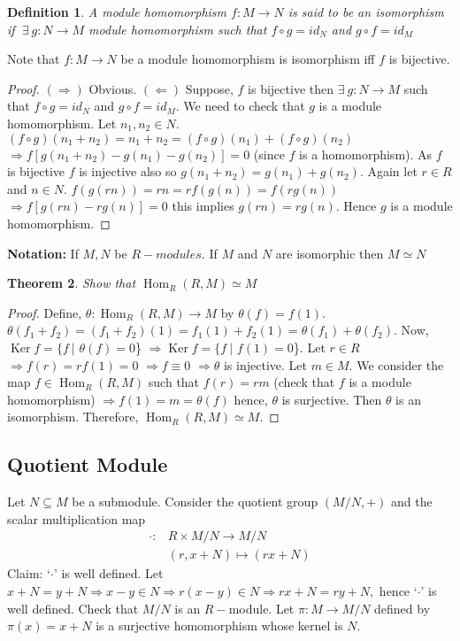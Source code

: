 \documentclass[11pt]{amsart}
\newtheorem{theorem}{Theorem}[section]
\newtheorem{definition}[theorem]{Definition}%
\begin{document}
\begin{definition}
A module homomorphism $f:M\rightarrow N$ is said to be an isomorphism if $~\exists ~g:N\rightarrow M$ module homomorphism such that $f\circ g=id_{N}$ and $g\circ f=id_{M}$  
\end{definition}
Note that $f:M\rightarrow N$ be a module homomorphism is isomorphism iff $f$ is bijective. 
\begin{proof}
$(\Rightarrow)$ Obvious.
\newline $(\Leftarrow)$ Suppose, $f$ is bijective then $\exists~ g:N\rightarrow M$ such that $f\circ g=id_{N}$ and $g\circ f=id_{M}.$ We need to check that $g$ is a module homomorphism. Let $n_{1},n_{2}\in N.$ $(f\circ g)(n_{1}+n_{2})=n_{1}+n_{2}=(f\circ g)(n_{1})+(f\circ g)(n_{2})$ $\Rightarrow f[g(n_{1}+n_{2})-g(n_{1})-g(n_{2})]=0$ (since $f$ is a homomorphism). As $f$ is bijective $f$ is injective also so $g(n_{1}+n_{2})=g(n_{1})+g(n_{2}).$ Again let $r\in R$ and $n\in N.$ $f(g(rn))=rn=rf(g(n))=f(rg(n))$ $\Rightarrow f[g(rn)-rg(n)]=0$ this implies $g(rn)=rg(n).$ Hence $g$ is a module homomorphism.
\end{proof}
\textbf{Notation:} If $M,N$ be $R-modules.$ If $M$ and $N$ are isomorphic then $M\simeq N$
\begin{theorem}
Show that $\operatorname{Hom}_{R}(R,M)\simeq M$
\end{theorem}
\begin{proof}
Define, $\theta: \operatorname{Hom}_{R}(R,M)\rightarrow M$ by $\theta(f)=f(1).$ $\theta(f_{1}+f_{2})=(f_{1}+f_{2})(1)=f_{1}(1)+f_{2}(1)=\theta(f_{1})+\theta(f_{2}).$ Now, $\operatorname{Ker}f=\{f~|$ $\theta(f)=0$\} $\Rightarrow \operatorname{Ker}f=\{f~|$ $ f(1)=0$\}. Let $r\in R$ $\Rightarrow f(r)=rf(1)=0$ $\Rightarrow f\equiv 0$ $\Rightarrow \theta$ is injective. Let $m\in M.$ We consider the map $f\in \operatorname{Hom}_{R}(R,M)$ such that $f(r)=rm$ (check that $f$ is a module homomorphism) $\Rightarrow f(1)=m=\theta(f)$ hence, $\theta$ is surjective. Then $\theta$ is an isomorphism. Therefore, $\operatorname{Hom}_{R}(R,M)\simeq M.$
\end{proof}
\subsection{Quotient Module}
Let $N\subseteq M$ be a submodule. Consider the quotient group $(M/N,+)$ and the scalar multiplication map \begin{align*}
\cdot :&R\times M/N\to M/N\\
&(r,x+N)\mapsto (rx+N)
\end{align*}
Claim: `$\cdot$' is well defined. Let $x+N=y+N \Rightarrow x-y\in N \Rightarrow r(x-y)\in N \Rightarrow rx+N=ry+N,$ hence `$\cdot$' is well defined. Check that $M/N$ is an $R-$module. Let $\pi:M\to M/N$ defined by $\pi(x)=x+N$ is a surjective homomorphism whose kernel is $N.$
\end{document}
